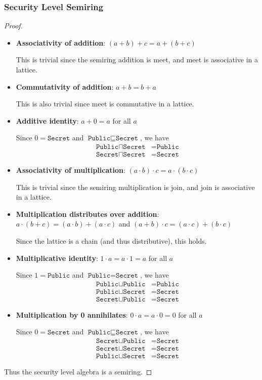 \documentclass[conference]{IEEEtran}
\newcommand\public{\texttt{Public}}
\newcommand\secret{\texttt{Secret}}
\begin{document}
\subsubsection{Security Level Semiring}
\label{app-b}
\begin{proof}\leavevmode
	\begin{itemize}
		\item \textbf{Associativity of addition}: $(a+b)+c=a+(b+c)$
		
		This is trivial since the semiring addition is meet, and meet is associative in a lattice.
		\item \textbf{Commutativity of addition}: $a+b=b+a$
		
		This is also trivial since meet is commutative in a lattice.
		\item \textbf{Additive identity}: $a+0=a$ for all $a$
		
		Since $0=\secret$ and $\public\sqsubseteq\secret$, we have
		\begin{equation}
			\begin{aligned}
				\public\sqcap\secret&=\public\\
				\secret\sqcap\secret&=\secret
			\end{aligned}
		\end{equation}
		\item \textbf{Associativity of multiplication}: $(a\cdot b)\cdot c=a\cdot (b\cdot c)$
		
		This is trivial since the semiring multiplication is join, and join is associative in a lattice.
		
		\item \textbf{Multiplication distributes over addition}: $a\cdot(b+c)=(a\cdot b)+(a\cdot c)$ and $(a+b)\cdot c=(a\cdot c)+(b\cdot c)$
		
		Since the lattice is a chain (and thus distributive), this holds.
		\item \textbf{Multiplicative identity}: $1\cdot a=a\cdot 1=a$ for all $a$
		
		Since $1=\public$ and $\public=\secret$, we have
		\begin{equation}
			\begin{aligned}
				\public\sqcup\public&=\public\\
				\public\sqcup\secret&=\secret\\
				\secret\sqcup\public&=\secret
			\end{aligned}
		\end{equation}
		\item \textbf{Multiplication by 0 annihilates}: $0\cdot a=a\cdot 0=0$ for all $a$
		
		Since $0=\secret$ and $\public\sqsubseteq\secret$, we have
		\begin{equation}
			\begin{aligned}
				\secret\sqcup\public&=\secret\\
				\secret\sqcup\secret&=\secret\\
				\public\sqcup\secret&=\secret
			\end{aligned}
		\end{equation}
	\end{itemize}
	Thus the security level algebra is a semiring.
\end{proof}
\end{document}
